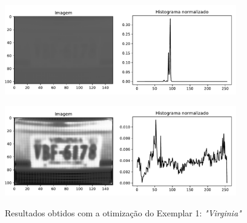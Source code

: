 \begin{figure}
	\centering
	\caption{Resultados obtidos com a otimização do Exemplar 1: \emph{"Virginia"}}
	\label{fig:result_histograms2}
	\begin{minipage}[b]{.99\linewidth}
		\includegraphics[width = 0.9\textwidth]{./figures/results_figures/histograma3.pdf}
		\label{fig:result_histograms2_output}
	\end{minipage}	

	\begin{minipage}[b]{.99\linewidth}
		\includegraphics[width = 0.9\textwidth]{./figures/results_figures/histograma4.pdf}
		\label{fig:result_histograms2_equalized}
	\end{minipage}	
	
\end{figure}

